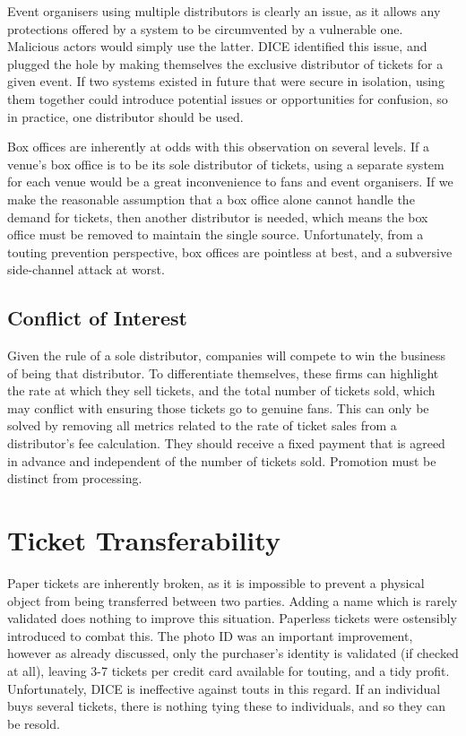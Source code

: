 \documentclass[12pt,a4]{bhamdissertation}
\begin{document}
Event organisers using multiple distributors is clearly an issue, as it allows any protections offered by a system to be circumvented by a vulnerable one. Malicious actors would simply use the latter. DICE identified this issue, and plugged the hole by making themselves the exclusive distributor of tickets for a given event. If two systems existed in future that were secure in isolation, using them together could introduce potential issues or opportunities for confusion, so in practice, one distributor should be used.

Box offices are inherently at odds with this observation on several levels. If a venue's box office is to be its sole distributor of tickets, using a separate system for each venue would be a great inconvenience to fans and event organisers. If we make the reasonable assumption that a box office alone cannot handle the demand for tickets, then another distributor is needed, which means the box office must be removed to maintain the single source. Unfortunately, from a touting prevention perspective, box offices are pointless at best, and a subversive side-channel attack at worst.

\subsection{Conflict of Interest}

Given the rule of a sole distributor, companies will compete to win the business of being that distributor. To differentiate themselves, these firms can highlight the rate at which they sell tickets, and the total number of tickets sold, which may conflict with ensuring those tickets go to genuine fans. This can only be solved by removing all metrics related to the rate of ticket sales from a distributor's fee calculation. They should receive a fixed payment that is agreed in advance and independent of the number of tickets sold. Promotion must be distinct from processing.

\section{Ticket Transferability}

Paper tickets are inherently broken, as it is impossible to prevent a physical object from being transferred between two parties. Adding a name which is rarely validated does nothing to improve this situation. Paperless tickets were ostensibly introduced to combat this. The photo ID was an important improvement, however as already discussed, only the purchaser's identity is validated (if checked at all), leaving 3-7 tickets per credit card available for touting, and a tidy profit. Unfortunately, DICE is ineffective against touts in this regard. If an individual buys several tickets, there is nothing tying these to individuals, and so they can be resold.
\end{document}
